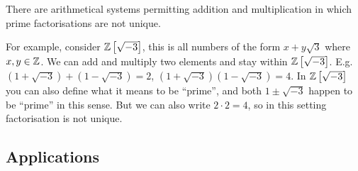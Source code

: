 \documentclass[../main.tex]{subfiles}
\begin{document}
\begin{remark}
  \nonexaminable
  There are arithmetical systems permitting addition and multiplication in which prime factorisations are not unique.

  For example, consider $\mathbb{Z}\left[\sqrt{-3}\right]$, this is all numbers of the form $x + y\sqrt{3}$ where $x, y \in \mathbb{Z}$.
  We can add and multiply two elements and stay within $\mathbb{Z}\left[\sqrt{-3}\right]$.
  E.g. $(1 + \sqrt{-3}) + (1 - \sqrt{-3}) = 2$, $(1 + \sqrt{-3})(1 - \sqrt{-3}) = 4$.
  In $\mathbb{Z}\left[\sqrt{-3}\right]$ you can also define what it means to be ``prime'', and both $1 \pm \sqrt{-3}$ happen to be ``prime'' in this sense.
  But we can also write $2 \cdot 2 = 4$, so in this setting factorisation is not unique.
\end{remark}
\subsection{Applications}
\end{document}
